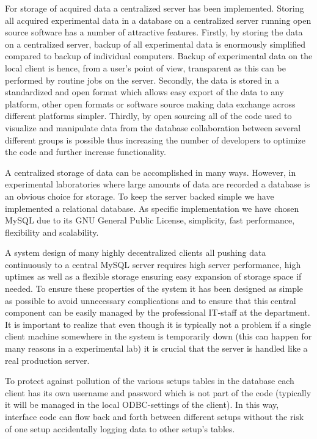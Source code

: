 For storage of acquired data a centralized server has been implemented. Storing
all acquired experimental data in a database on a centralized server running
open source software has a number of attractive features. Firstly, by storing
the data on a centralized server, backup of all experimental data is enormously
simplified compared to backup of individual computers. Backup of experimental
data on the local client is hence, from a user's point of view, transparent as
this can be performed by routine jobs on the server. Secondly, the data is
stored in a standardized and open format which allows easy export of the data
to any platform, other open formats or software source making data exchange
across different platforms simpler. Thirdly, by open sourcing all of the code
used to visualize and manipulate data from the database collaboration between
several different groups is possible thus increasing the number of developers
to optimize the code and further increase functionality.

A centralized storage of data can be accomplished in many ways. However, in
experimental laboratories where large amounts of data are recorded a database
is an obvious choice for storage. To keep the server backed simple we have
implemented a relational database. As specific implementation we have chosen
MySQL due to its GNU General Public License, simplicity, fast performance,
flexibility and scalability.

A system design of many highly decentralized clients all pushing data
continuously to a central MySQL server requires high server performance, high
uptimes as well as a flexible storage ensuring easy expansion of storage space
if needed. To ensure these properties of the system it has been designed as
simple as possible to avoid unnecessary complications and to ensure that this
central component can be easily managed by the professional IT-staff at the
department. It is important to realize that even though it is typically not a
problem if a single client machine somewhere in the system is temporarily down
(this can happen for many reasons in a experimental lab) it is crucial that the
server is handled like a real production server.

To protect against pollution of the various setups tables in the database each
client has its own username and password which is not part of the code
(typically it will be managed in the local ODBC-settings of the client). In
this way, interface code can flow back and forth between different setups
without the risk of one setup accidentally logging data to other setup's
tables.

